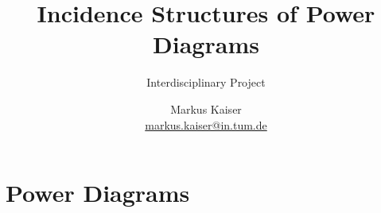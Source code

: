


\title{Incidence Structures of Power Diagrams}
\subtitle{Interdisciplinary Project}
\author{%
    \texorpdfstring{Markus Kaiser\\\href{mailto:markus.kaiser@in.tum.de}{markus.kaiser@in.tum.de}}{Markus Kaiser}}
\publishers{Technische Universität München}


\maketitle
\begin{abstract}
    \blindtext
\end{abstract}

\section{Power Diagrams}
\label{sec:powerdiagrams}


